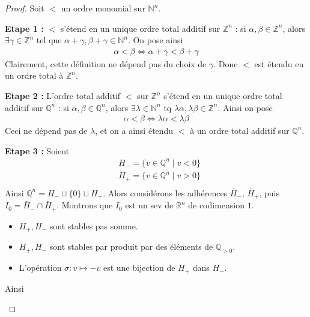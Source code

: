         \begin{proof}
            Soit $<$ un ordre monomial sur $\mathbb{N}^n$.
            \item \textbf{Etape 1 :} $<$ s'étend en un unique ordre total additif sur $\mathbb{Z}^n$ : si $\alpha, \beta \in \mathbb{Z}^n$, alors $\exists \gamma \in \mathbb{Z}^n$ tel que $\alpha + \gamma, \beta + \gamma \in \mathbb{N}^n$. On pose ainsi
            \begin{align*}
                \alpha < \beta \iff \alpha + \gamma < \beta + \gamma 
            \end{align*}
            Clairement, cette définition ne dépend pas du choix de $\gamma$. Donc $<$ est étendu en un ordre total à $\mathbb{Z}^n$.
            \item \textbf{Etape 2 :} L'ordre total additif $<$ sur $\mathbb{Z}^n$ s'étend en un unique ordre total additif sur $\mathbb{Q}^n$ : si $\alpha, \beta \in \mathbb{Q}^n$, alors $\exists \lambda \in \mathbb{N}^n$ tq $\lambda \alpha, \lambda \beta \in \mathbb{Z}^n$. Ainsi on pose 
            \begin{align*}
                \alpha < \beta \iff \lambda \alpha < \lambda \beta
            \end{align*}
            Ceci ne dépend pas de $\lambda$, et on a ainsi étendu $<$ à un ordre total additif sur $\mathbb{Q}^n$.
            \item \textbf{Etape 3 :} Soient
            \begin{align*}
                &H_- =  \{v \in \mathbb{Q}^n \mid v < 0\} \\
                &H_+ =  \{v \in \mathbb{Q}^n \mid v > 0\} \\
            \end{align*}
            Ainsi $\mathbb{Q}^n = H_- \sqcup \{0\} \sqcup H_+$. Alors considérons les adhérences $\bar H_-$, $\bar H_+$, puis $I_0 = \bar H_- \cap \bar H_+$. Montrons que $I_0$ est un sev de $\mathbb{R}^n$ de codimension $1$.
            \begin{itemize}
                \item $H_+, H_-$ sont stables pas somme.
                \item $H_+, H_-$ sont stables par produit par des éléments de $\mathbb{Q}_{>0}$.
                \item L'opération $\sigma : v \mapsto -v$ est une bijection de $H_+$ dans $H_-$.
            \end{itemize}
            Ainsi
            \begin{itemize}

\end{itemize}
\end{proof}
